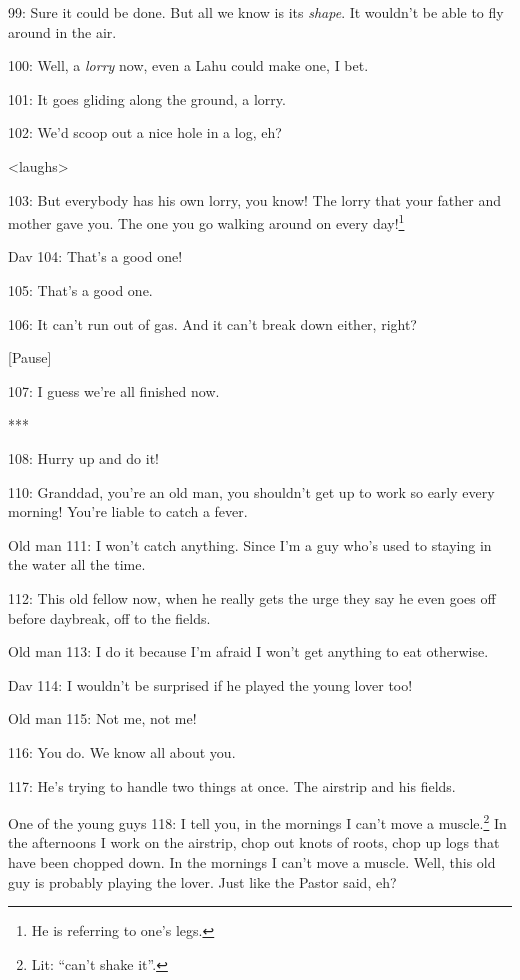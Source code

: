 99: Sure it could be done. But all we know is its \textit{shape}. It wouldn't be
able to fly around in the air.

100: Well, a \textit{lorry }now, even a Lahu could make one, I bet.

101: It goes gliding along the ground, a lorry.

102: We'd scoop out a nice hole in a log, eh?

<laughs>

103: But everybody has his own lorry, you know! The lorry that your father and
mother gave you. The one you go walking around on every day!\footnote{He is referring to one's legs.}

Dav 104: That's a good one!

105: That's a good one.

106: It can't run out of gas. And it can't break down either, right?

\begin{center}
[Pause]
\end{center}

\leftskip=0pt
107: I guess we're all finished now.

\begin{center}
***
\end{center}

\leftskip=0pt
108: Hurry up and do it!

110: Granddad, you're an old man, you shouldn't get up to work so early every morning!
You're liable to catch a fever.

Old man 111: I won't catch anything. Since I'm a guy who's used to staying in the
water all the time.

112: This old fellow now, when he really gets the urge they say he even goes off
before daybreak, off to the fields.

Old man 113: I do it because I'm afraid I won't get anything to eat otherwise.

Dav 114: I wouldn't be surprised if he played the young lover too!

Old man 115: Not me, not me!

116: You do. We know all about you.

117: He's trying to handle two things at once. The airstrip and his fields.

One of the young guys 118: I tell you, in the mornings I can't move a muscle.\footnote{Lit: ``can't shake it''.}
In the afternoons I work on the airstrip, chop out knots of roots, chop up logs
that have been chopped down. In the mornings I can't move a muscle. Well, this
old guy is probably playing the lover. Just like the Pastor said, eh?

